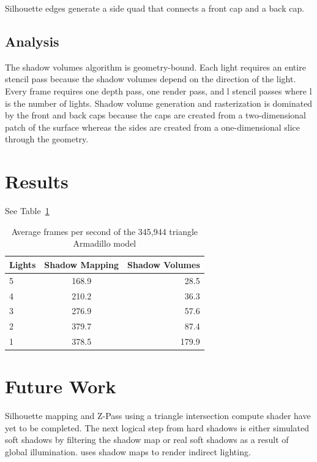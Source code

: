 \documentclass[12pt]{article}
\begin{document}
Silhouette edges generate a side quad that connects a front cap and a back cap.

\subsection{Analysis}

The shadow volumes algorithm is geometry-bound. Each light requires an entire stencil pass because the shadow volumes depend on the direction of the light.
Every frame requires one depth pass, one render pass, and l stencil passes where l is the number of lights. Shadow volume generation and rasterization is dominated by the front and back caps because the caps are created from a two-dimensional patch of the surface whereas the sides are created from a one-dimensional slice through the geometry.

\section{Results}

See Table~\ref{tab:widgets}

\begin{table}
\centering
\begin{tabular}{|l|c|r|}
\hline
Lights & Shadow Mapping & Shadow Volumes \\\hline
5 & 168.9 & 28.5 \\
4 & 210.2 & 36.3 \\
3 & 276.9 & 57.6 \\
2 & 379.7 & 87.4 \\
1 & 378.5 & 179.9 \\
\hline
\end{tabular}
\caption{\label{tab:widgets} Average frames per second of the 345,944 triangle Armadillo model}
\end{table}

\section{Future Work}

Silhouette mapping and Z-Pass using a triangle intersection compute shader have yet to be completed. The next logical step from hard shadows is either simulated soft shadows by filtering the shadow map or real soft shadows as a result of global illumination.
\cite{Dachsbacher:2005:RSM:1053427.1053460} uses shadow maps to render indirect lighting.



\end{document}

